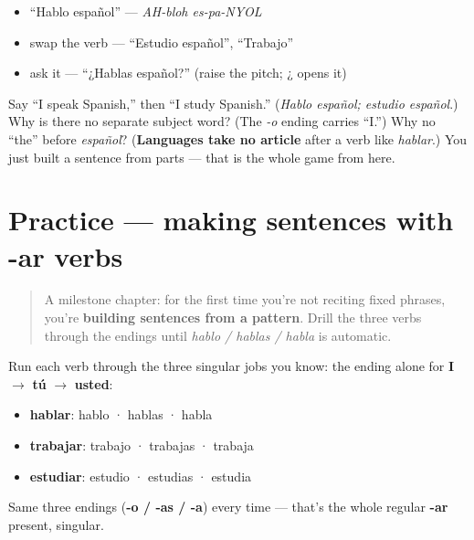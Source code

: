 \begin{itemize}
\raggedright
  \item \textquotedblleft{}Hablo español\textquotedblright{} — \emph{AH-bloh es-pa-NYOL}
  \item swap the verb — \textquotedblleft{}Estudio español\textquotedblright{}, \textquotedblleft{}Trabajo\textquotedblright{}
  \item ask it — \textquotedblleft{}¿Hablas español?\textquotedblright{} (raise the pitch; ¿ opens it)
\end{itemize}

\begin{tcolorbox}[breakable,colback=teal!4,colframe=teal!35!black,title={Before you move on}]
Say \textquotedblleft{}I speak Spanish,\textquotedblright{} then \textquotedblleft{}I study Spanish.\textquotedblright{} (\emph{Hablo español; estudio español}.) Why is there no separate subject word? (The \emph{-o} ending carries \textquotedblleft{}I.\textquotedblright{}) Why no \textquotedblleft{}the\textquotedblright{} before \emph{español}? (\textbf{Languages take no article} after a verb like \emph{hablar}.) You just built a sentence from parts — that is the whole game from here.
\end{tcolorbox}
\section[Practice]{Practice — making sentences with -ar verbs}

\label{lesson:ES-C06-practice}



\begin{quote}
A milestone chapter: for the first time you're not reciting fixed phrases, you're \textbf{building sentences from a pattern}. Drill the three verbs through the endings until \emph{hablo / hablas / habla} is automatic.
\end{quote}

\begin{grammarlens}[title={Grammar Lens: conjugate on command}]
Run each verb through the three singular jobs you know: the ending alone for \textbf{I} $\to$ \textbf{tú} $\to$ \textbf{usted}:

\begin{itemize}
\raggedright
  \item \textbf{hablar}: hablo · hablas · habla
  \item \textbf{trabajar}: trabajo · trabajas · trabaja
  \item \textbf{estudiar}: estudio · estudias · estudia
\end{itemize}

Same three endings (\textbf{-o / -as / -a}) every time — that's the whole regular \textbf{-ar} present, singular.
\end{grammarlens}

